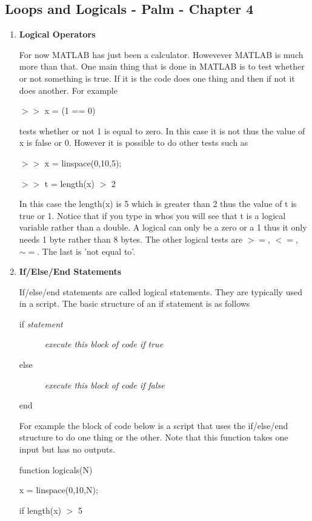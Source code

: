 \subsection{Loops and Logicals - Palm - Chapter 4}

\begin{enumerate}

\item \textbf{Logical Operators}

For now MATLAB has just been a calculator. Howevever MATLAB is much
more than that. One main thing that is done in MATLAB is to test
whether or not something is true. If it is the code does one thing and
then if not it does another. For example

$>>$ x = (1 == 0)

tests whether or not 1 is equal to zero. In this case it is not thus
the value of x is false or 0. However it is possible to do other tests
such as

$>>$ x = linspace(0,10,5);

$>>$ t = length(x) $>$ 2

In this case the length(x) is 5 which is greater than 2 thus the value
of t is true or 1. Notice that if you type in whos you will see that t
is a logical variable rather than a double. A logical can only be a
zero or a 1 thus it only needs 1 byte rather than 8 bytes. The other
logical tests are $>=$, $<=$, $\sim=$. The last is 'not equal to'.

\item \textbf{If/Else/End Statements}

If/else/end statements are called logical statements. They are
typically used in a script. The basic structure of an if statement is
as follows

if {\it statement}

~~~~~~{\it execute this block of code if true}

else

~~~~~~{\it execute this block of code if false}

end

For example the block of code below is a script that uses the
if/else/end structure to do one thing or the other. Note that this
function takes one input but has no outputs.

\begin{framed}

function logicals(N)

x = linspace(0,10,N);

if length(x) $>$ 5


\end{framed}
\end{enumerate}

